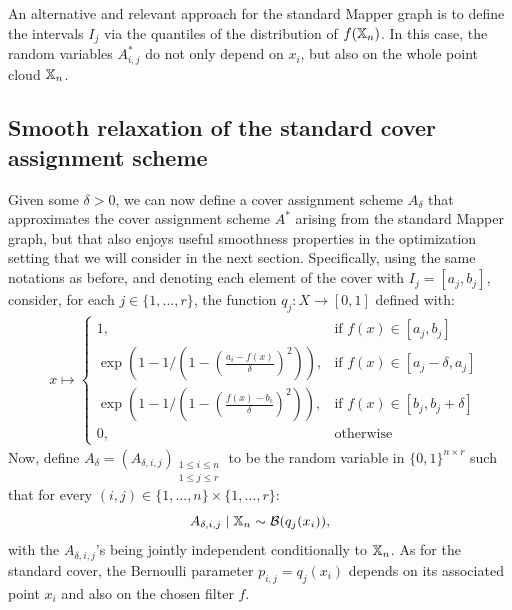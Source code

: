 
\begin{remark}
    An alternative and relevant approach for the standard Mapper graph is to define the intervals $I_j$ via the quantiles of the distribution of $f(\mathbb{X}_n)$.  
In this case, the random variables $A^\ast_{i,j}$ do not only depend on $x_i$, but also on the whole point cloud $\mathbb{X}_n$.
\end{remark}


\subsection{Smooth relaxation of the standard cover assignment scheme}
\label{sec:Smooth}

Given some $\delta>0$, we can now define a cover assignment scheme $A_\delta$ that approximates the cover assignment scheme $A^\ast$ arising from the standard Mapper graph,
but that also enjoys useful smoothness properties in the optimization setting that we will consider in the next section. %
Specifically, using the same notations as before, and denoting each element of the cover with $I_j=[a_j,b_j]$, consider, for each $j\in\{1,...,r\}$, the function $q_j\colon X  \longrightarrow [0,1]$ defined with:
\begin{align*}
&x \mapsto 
\begin{cases}
    1,& \text{if } f(x)\in [a_j,b_j]\\
    \exp(1-1/(1-(\frac{a_i-f(x)}{\delta})^2)),& \text{if } f(x)\in [a_j-\delta,a_j]\\
    \exp(1-1/(1-(\frac{f(x)-b_i}{\delta})^2)),& \text{if } f(x)\in [b_j,b_j+\delta]\\
    0,              & \text{otherwise}
\end{cases}
\end{align*}
\noindent
Now, define $A_\delta=(A_{\delta,i,j})_{\substack{1\leq i\leq n \\ 1\leq j\leq r}}$ to be the random variable in $\{0,1\}^{n\times r}$ such that for every $(i,j)\in\{1,...,n\}\times\{1,...,r\}$:
$$ A_{\delta,i,j}\mid \mathbb{X}_n \sim \mathcal{B}(q_j(x_i)),$$
with the $ A_{\delta,i,j}$'s being jointly independent conditionally to $\mathbb{X}_n$.
As for the standard cover, the Bernoulli parameter $p_{i,j} = q_j(x_i)$ depends on its associated point $x_i$ and also on the chosen filter $f$. 


